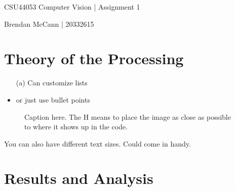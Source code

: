 \documentclass{article}  %
\begin{document}
	
	\begin{center}
		\begin{Large}
			CSU44053 Computer Vision | Assignment 1
			
			Brendan McCann | 20332615
		\end{Large}
	\end{center}
	
	\section{Theory of the Processing}
	
	\begin{itemize}
		\item[(a)] Can customize lists
		\item or just use bullet points
	\end{itemize}
	
	\begin{figure}[H]
		\centering
		\caption{Caption here. The H means to place the image as close as possible to where it shows up in the code.}
	\end{figure}
	
	\begin{small}
		You can also have different text sizes. Could come in handy.
	\end{small}
	
	\newpage
	\section{Results and Analysis}
	
\end{document}
